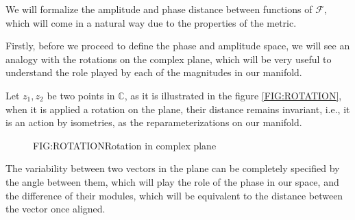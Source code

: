 
We will formalize the amplitude and phase distance between functions of
$\mathcal{F}$, which will come in a natural way due to the properties of the
metric.

Firstly, before we proceed to define the phase and amplitude space, we will see
an analogy with the rotations on the complex plane, which will be very useful to
understand the role played by each of the magnitudes in our manifold.

Let  $z_1, z_2$ be two points in $\mathbb{C}$, as it is illustrated in the
figure \ref{FIG:ROTATION}, when it is applied a rotation on the plane, their
distance remains invariant, i.e., it is an action by isometries, as the
reparameterizations on our manifold.


\begin{figure}[Rotation in complex plane]{FIG:ROTATION}{Rotation in complex plane}

\end{figure}

The variability between two vectors in the plane can be completely specified by
the angle between them, which will play the role of the phase in our space, and
the difference of their modules, which will be equivalent to the distance
between the vector once aligned.

